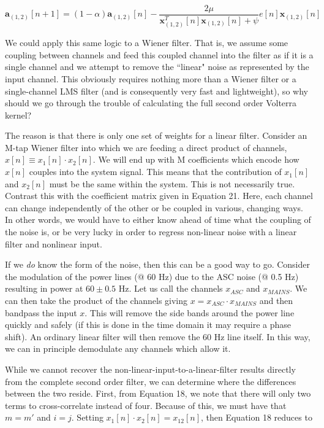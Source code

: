 \documentclass{article}
\begin{document}
\begin{equation}
    \mathbf{a}_{(1,2)}[n+1] = (1-\alpha)\mathbf{a}_{(1,2)}[n] -
    \frac{2\mu}{\mathbf{x}_{(1,2)}^T[n]\mathbf{x}_{(1,2)}[n] + \psi} e[n]
    \mathbf{x}_{(1,2)}[n]
\end{equation}

We could apply this same logic to a Wiener filter. That is, we assume some
coupling between channels and feed this coupled channel into the filter as if 
it is a single channel and we attempt to remove the ``linear" noise as
represented by the input channel. This obviously requires nothing more than
a Wiener filter or a single-channel LMS filter (and is consequently very fast
and lightweight), so why should we go through the trouble of calculating the
full second order Volterra kernel? 

\vspace{1em}
The reason is that there is only one set of weights for a linear filter.
Consider an M-tap Wiener filter into which we are feeding a direct product of
channels, $x[n] \equiv x_1[n] \cdot x_2[n]$. We will end up with M coefficients
which encode how $x[n]$ couples into the system signal. This means that the
contribution of $x_1[n]$ and $x_2[n]$ must be the same within the system. This
is not necessarily true. Contrast this with the coefficient matrix given in
Equation 21. Here, each channel can change independently of the other or be
coupled in various, changing ways. In other words, we would have to either
know ahead of time what the coupling of the noise is, or be very lucky in
order to regress non-linear noise with a linear filter and nonlinear input.

\vspace{1em}
If we \emph{do} know the form of the noise, then this can be a good way to
go. Consider the modulation of the power lines (@ 60 Hz) due to the ASC noise 
(@ 0.5 Hz) resulting in power at $60 \pm 0.5$ Hz. Let us call the channels
$x_{ASC}$ and $x_{MAINS}$. We can then take the product of the channels
giving $x = x_{ASC} \cdot x_{MAINS}$ and then bandpass the input $x$. This
will remove the side bands around the power line quickly and safely (if this
is done in the time domain it may require a phase shift). An ordinary linear
filter will then remove the 60 Hz line itself. In this way, we can in 
principle demodulate any channels which allow it. 

While we cannot recover the non-linear-input-to-a-linear-filter results
directly from the complete second order filter, we can determine where the
differences between the two reside. First, from Equation 18, we note that
there will only two terms to cross-correlate instead of four. Because of
this, we must have that $m=m'$ and $i=j$. Setting $x_1[n]\cdot x_2[n] =
x_{12}[n]$, then Equation 18 reduces to
\end{document}
